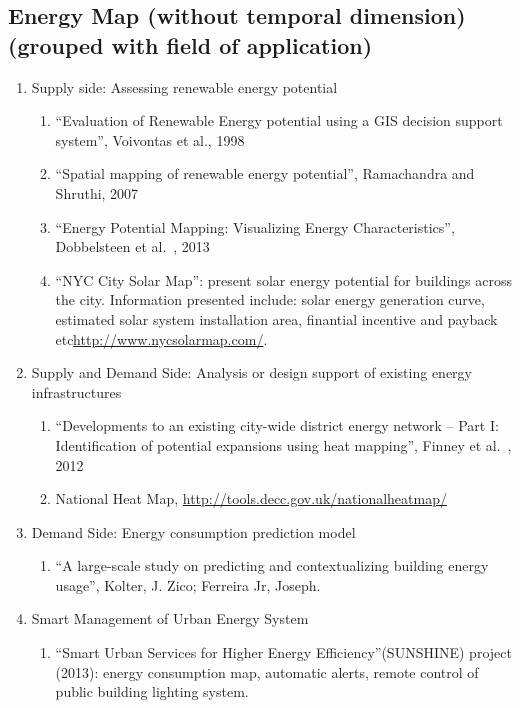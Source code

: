 \documentclass[12pt]{article}
\begin{document}
\subsection{Energy Map (without temporal dimension) (grouped with field
  of application)}
\begin{enumerate}[label*=\arabic*.]
\item Supply side: Assessing renewable energy potential
  \begin{enumerate}[label*=\arabic*.]
  \item ``Evaluation of Renewable Energy potential using a {GIS}
    decision support system'', Voivontas et al., 1998
  \item ``Spatial mapping of renewable energy potential'', Ramachandra
    and Shruthi, 2007
  \item ``Energy Potential Mapping: Visualizing Energy
    Characteristics'', Dobbelsteen et al.\ , 2013
  \item ``NYC City Solar Map'': present solar energy potential for
    buildings across the city. Information presented include: solar
    energy generation curve, estimated solar system installation area,
    finantial incentive and payback etc\url{http://www.nycsolarmap.com/}.
    \end{enumerate}

\item Supply and Demand Side: Analysis or design support of existing energy infrastructures
    \begin{enumerate}[label*=\arabic*.]
    \item ``Developments to an existing city-wide district energy
    network – Part I: Identification of potential expansions using
    heat mapping'', Finney et al.\ , 2012
    \item National Heat Map, \url{http://tools.decc.gov.uk/nationalheatmap/}
    \end{enumerate}
\item Demand Side: Energy consumption prediction model
    \begin{enumerate}[label*=\arabic*.]
      \item ``A large-scale study on predicting and contextualizing building energy usage'', Kolter, J. Zico; Ferreira Jr, Joseph.
    \end{enumerate}
\item Smart Management of Urban Energy System
    \begin{enumerate}[label*=\arabic*.]
    \item ``Smart Urban Services for Higher Energy
    Efficiency''(SUNSHINE) project (2013): energy consumption map,
    automatic alerts, remote control of public building lighting
    system.
    \end{enumerate}
\end{enumerate}
\end{document}
